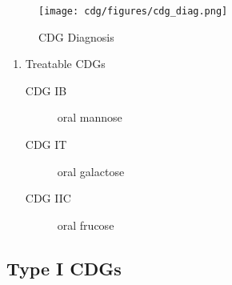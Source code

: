 \documentclass[12pt]{scrartcl}
\begin{document}
\begin{figure}[htbp]
\centering
\texttt{[image: cdg/figures/cdg\_diag.png]}
\caption{\label{fig:org17ec8c7}CDG Diagnosis}
\end{figure}

\begin{enumerate}
\item Treatable CDGs
\label{sec:org2efc47c}
\begin{description}
\item[{CDG IB}] oral mannose
\item[{CDG IT}] oral galactose
\item[{CDG IIC}] oral frucose
\end{description}
\end{enumerate}

\subsection{Type I CDGs}
\label{sec:orgdf5eb7c}
\end{document}

